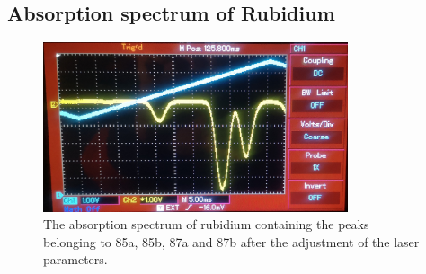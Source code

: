 \subsection{Absorption spectrum of Rubidium}

\begin{figure}[ht]
    \center
    \includegraphics[width=0.8\textwidth]{bilder/spectrum.jpg}
    \caption{The absorption spectrum of rubidium containing the peaks belonging to 85a, 85b, 87a and 87b after the adjustment of the laser parameters. \cite{anleitungHeNe}}
    \label{fig:spectrum}
\end{figure}